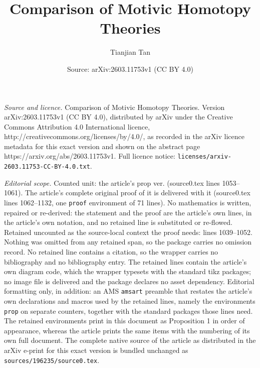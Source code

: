 \documentclass[10pt,a4paper]{amsart}
\title{Comparison of Motivic Homotopy Theories}
\author{Tianjian Tan}
\date{Source: arXiv:2603.11753v1 (CC BY 4.0)}
\begin{document}
\maketitle

\noindent\emph{Source and licence.} Comparison of Motivic Homotopy Theories. Version arXiv:2603.11753v1 (CC BY 4.0), distributed by arXiv under the Creative Commons Attribution 4.0 International licence, http://creativecommons.org/licenses/by/4.0/, as recorded in the arXiv licence metadata for this exact version and shown on the abstract page https://arxiv.org/abs/2603.11753v1. Full licence notice: \texttt{licenses/arxiv-2603.11753-CC-BY-4.0.txt}.\par\smallskip

\noindent\textit{Editorial scope.} Counted unit: the article's prop ver. (source0.tex lines 1053--1061). The article's complete original proof of it is delivered with it (source0.tex lines 1062--1132, one \texttt{proof} environment of 71 lines). No mathematics is written, repaired or re-derived: the statement and the proof are the article's own lines, in the article's own notation, and no retained line is substituted or re-flowed.  Retained uncounted as the source-local context the proof needs: lines 1039--1052.  Nothing was omitted from any retained span, so the package carries no omission record.  No retained line contains a citation, so the wrapper carries no bibliography and no bibliography entry.  The retained lines contain the article's own diagram code, which the wrapper typesets with the standard tikz packages; no image file is delivered and the package declares no asset dependency.  Editorial formatting only, in addition: an AMS \texttt{amsart} preamble that restates the article's own declarations and macros used by the retained lines, namely the environments \texttt{prop} on separate counters, together with the standard packages those lines need.  The retained environments print in this document as Proposition 1 in order of appearance, whereas the article prints the same items with the numbering of its own full document.  The complete native source of the article as distributed in the arXiv e-print for this exact version is bundled unchanged as \texttt{sources/196235/source0.tex}.
\end{document}
